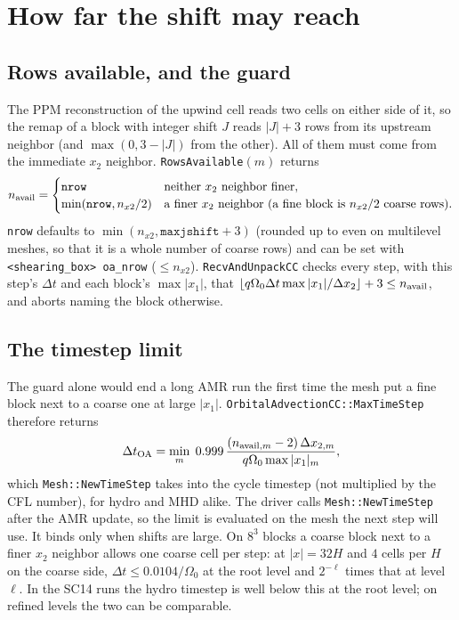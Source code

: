 \documentclass[11pt]{article}
\newcommand{\code}[1]{\texttt{#1}}
\newcommand{\fn}[1]{\texttt{\small #1}}
\newcommand{\Om}{\Omega_0}
\newcommand{\qom}{q\Om}
\begin{document}
\section{How far the shift may reach}
\label{sec:shiftlimit}

\subsection{Rows available, and the guard}
The PPM reconstruction of the upwind cell reads two cells on either side of it, so the
remap of a block with integer shift $J$ reads $|J| + 3$ rows from its upstream neighbor
(and $\max(0, 3-|J|)$ from the other). All of them must come from the immediate $x_2$
neighbor. \fn{RowsAvailable}$(m)$ returns
\begin{equation}
  n_{\rm avail} = \begin{cases}
    \code{nrow} & \text{neither $x_2$ neighbor finer},\\
    \min(\code{nrow}, n_{x2}/2) & \text{a finer $x_2$ neighbor (a fine block is
    $n_{x2}/2$ coarse rows).}
  \end{cases}
\end{equation}
\code{nrow} defaults to $\min(n_{x2}, \code{maxjshift} + 3)$ (rounded up to even on
multilevel meshes, so that it is a whole number of coarse rows) and can be set with
\code{<shearing\_box> oa\_nrow} ($\le n_{x2}$). \fn{RecvAndUnpackCC} checks every step,
with this step's $\Delta t$ and each block's $\max|x_1|$, that
$\lfloor \qom\Delta t\max|x_1|/\Delta x_2\rfloor + 3 \le n_{\rm avail}$, and aborts
naming the block otherwise.

\subsection{The timestep limit}
\label{sec:oadt}
The guard alone would end a long AMR run the first time the mesh put a fine block next to
a coarse one at large $|x_1|$. \fn{OrbitalAdvectionCC::MaxTimeStep} therefore returns
\begin{equation}
  \Delta t_{\rm OA} = \min_m\; 0.999\,
  \frac{(n_{{\rm avail},m} - 2)\,\Delta x_{2,m}}{\qom \max|x_1|_m},
\end{equation}
which \fn{Mesh::NewTimeStep} takes into the cycle timestep (not multiplied by the CFL
number), for hydro and MHD alike. The driver calls \fn{Mesh::NewTimeStep} after the AMR
update, so the limit is evaluated on the mesh the next step will use. It binds only when
shifts are large. On $8^3$ blocks a coarse block next to a finer $x_2$ neighbor allows one
coarse cell per step: at $|x| = 32H$ and $4$ cells per $H$ on the coarse side,
$\Delta t \le 0.0104/\Om$ at the root level and $2^{-\ell}$ times that at level $\ell$. In
the SC14 runs the hydro timestep is well below this at the root level; on refined levels
the two can be comparable.
\end{document}
